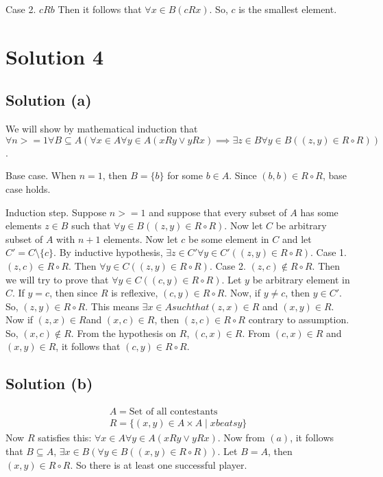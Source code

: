 \documentclass{article}
\begin{document}
Case 2. $cRb$ Then it follows that $\forall x \in B(cRx)$. So, $c$ is
the smallest element.

\section{Solution 4}
\subsection{Solution (a)}
We will show by mathematical induction that $\forall n >= 1 \forall B
\subseteq A (\forall x \in A \forall y \in A(xRy \lor yRx) \implies
\exists z \in B \forall y \in B((z,y) \in R \circ R))$.

Base case. When $n=1$, then $B = \{b\}$ for some $b \in A$. Since
$(b,b) \in R \circ R$, base case holds.

Induction step. Suppose $n >= 1$ and suppose that every subset of $A$
has some elements $z \in B$ such that $\forall y \in B((z,y) \in R
\circ R)$. Now let $C$ be arbitrary subset of $A$ with $n+1$ elements.
Now let $c$ be some element in $C$ and let $C' = C \setminus \{c\}$.
By inductive hypothesis, $\exists z \in C' \forall y \in C'((z,y) \in
R \circ R)$.
Case 1. $(z,c) \in R \circ R$. Then $\forall y \in C((z,y) \in R \circ
R)$.
Case 2. $(z,c) \notin R \circ R$. Then we will try to prove that
$\forall y \in C((c,y) \in R \circ R)$. Let $y$ be arbitrary element
in $C$. If $y = c$, then since $R$ is reflexive, $(c,y) \in R \circ
R$. Now, if $y \neq c$, then $y \in C'$. So, $(z,y) \in R \circ R$.
This means $\exists x \in A such that (z,x) \in R$ and $(x,y) \in R$.
Now if $(z,x) \in R$and $(x,c) \in R$, then $(z,c) \in R \circ R$
contrary to assumption. So, $(x,c) \notin R$. From the hypothesis on
$R$, $(c,x) \in R$. From $(c,x) \in R$ and $(x,y) \in R$, it follows
that $(c,y) \in R \circ R$.

\subsection{Solution (b)}
\begin{align*}
  A = \text{Set of all contestants} \\
  R = \{(x,y) \in A \times A \mid x beats y \} 
\end{align*}
Now $R$ satisfies this: $\forall x \in A \forall y \in A(xRy \lor
yRx)$. Now from $(a)$, it follows that $B \subseteq A$, $\exists x \in
B(\forall y \in B((x,y) \in R \circ R))$. Let $B=A$, then $(x,y) \in R
\circ R$. So there is at least one successful player.
\end{document}
